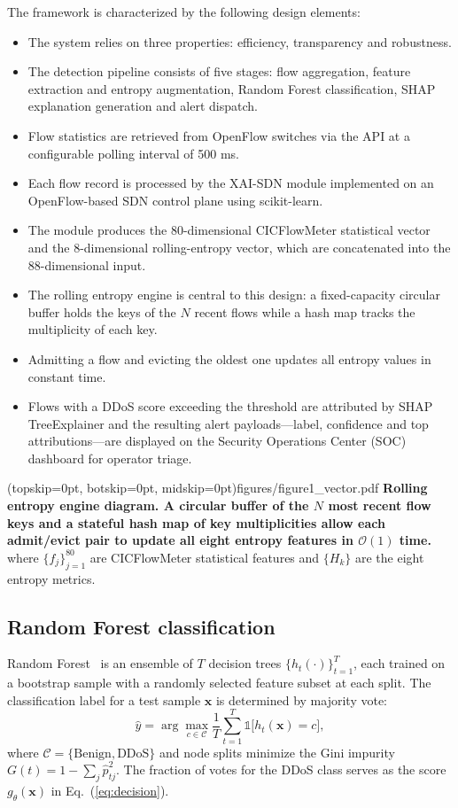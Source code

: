 \documentclass{ieeeaccess}
\begin{document}
The framework is characterized by the following design elements:
\begin{itemize}
\item The system relies on three properties: efficiency, transparency and robustness.
\item The detection pipeline consists of five stages: flow aggregation, feature extraction and entropy augmentation, Random Forest classification, SHAP explanation generation and alert dispatch.
\item Flow statistics are retrieved from OpenFlow switches via the API at a configurable polling interval of 500 ms.
\item Each flow record is processed by the XAI-SDN module implemented on an OpenFlow-based SDN control plane using scikit-learn.
\item The module produces the 80-dimensional CICFlowMeter statistical vector and the 8-dimensional rolling-entropy vector, which are concatenated into the 88-dimensional input.
\item The rolling entropy engine is central to this design: a fixed-capacity circular buffer holds the keys of the $N$ recent flows while a hash map tracks the multiplicity of each key.
\item Admitting a flow and evicting the oldest one updates all entropy values in constant time.
\item Flows with a DDoS score exceeding the threshold are attributed by SHAP TreeExplainer and the resulting alert payloads---label, confidence and top attributions---are displayed on the Security Operations Center (SOC) dashboard for operator triage.
\end{itemize}

\Figure[t!](topskip=0pt, botskip=0pt, midskip=0pt){figures/figure1_vector.pdf}
{ \textbf{Rolling entropy engine diagram. A circular buffer of the $N$ most recent flow keys and a stateful hash map of key multiplicities allow each admit/evict pair to update all eight entropy features in $\mathcal{O}(1)$ time.}\label{fig:entropyengine}}
where $\{f_j\}_{j=1}^{80}$ are CICFlowMeter statistical features and $\{H_k\}$ are the eight entropy metrics.

\subsection{Random Forest classification}
Random Forest~\cite{breiman2001rf} is an ensemble of $T$ decision trees $\{h_t(\cdot)\}_{t=1}^{T}$, each trained on a bootstrap sample with a randomly selected feature subset at each split. The classification label for a test sample $\mathbf{x}$ is determined by majority vote:
\begin{equation}
\hat{y} = \arg\max_{c \in \mathcal{C}} \frac{1}{T} \sum_{t=1}^{T} \mathbb{1}\bigl[h_t(\mathbf{x}) = c\bigr],
\label{eq:rfpred}
\end{equation}
where $\mathcal{C} = \{\text{Benign}, \text{DDoS}\}$ and node splits minimize the Gini impurity $G(t) = 1 - \sum_{j} \hat{p}_{tj}^{2}$. The fraction of votes for the DDoS class serves as the score $g_{\theta}(\mathbf{x})$ in Eq.~(\ref{eq:decision}).
\end{document}
